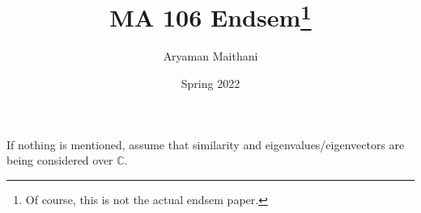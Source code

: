 \documentclass[12pt]{article}
\title{MA 106 Endsem\footnote{Of course, this is not the actual endsem paper.}}
\author{Aryaman Maithani}
\date{Spring 2022}
\begin{document}
\maketitle


If nothing is mentioned, assume that similarity and eigenvalues/eigenvectors are being considered over $\mathbb{C}$. 
\end{document}
